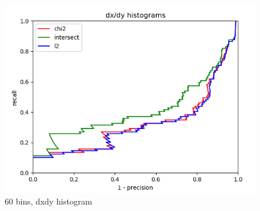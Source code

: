 \documentclass{article}
\begin{document}
\begin{figure}[ht]
\begin{minipage}{.5\textwidth}
        \includegraphics[width=\linewidth]{images/Q4.b-dxdy_histogram_60_bins.png}
        \caption{60 bins, dxdy histogram}
    \end{minipage}
\end{figure}
\end{document}
